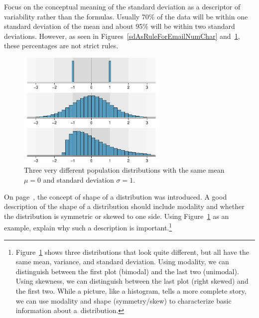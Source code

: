\begin{tipBox}{
Focus on the conceptual meaning of the standard deviation as a descriptor of variability rather than the formulas. Usually 70\% of the data will be within one standard deviation of the mean and about 95\% will be within two standard deviations. However, as seen in Figures~\ref{sdAsRuleForEmailNumChar} and~\ref{severalDiffDistWithSdOf1}, these percentages are not strict rules.}
\end{tipBox}

\begin{figure}
\centering
\includegraphics[width=0.64\textwidth]{ch_intro_to_data/figures/severalDiffDistWithSdOf1/severalDiffDistWithSdOf1}
\caption{Three very different population distributions with the same mean $\mu=0$ and standard deviation $\sigma=1$.}
\label{severalDiffDistWithSdOf1}
\end{figure}

\begin{exercise}
On page~\pageref{shapeFirstDiscussed}, the concept of shape of a distribution was introduced. A good description of the shape of a distribution should include modality and whether the distribution is symmetric or skewed to one side. Using Figure~\ref{severalDiffDistWithSdOf1} as an example, explain why such a description is important.\footnote{Figure~\ref{severalDiffDistWithSdOf1} shows three distributions that look quite different, but all have the same mean, variance, and standard deviation. Using modality, we can distinguish between the first plot (bimodal) and the last two (unimodal). Using skewness, we can distinguish between the last plot (right skewed) and the first two. While a picture, like a histogram, tells a more complete story, we can use modality and shape (symmetry/skew) to characterize basic information about a~distribution.}
\end{exercise}

